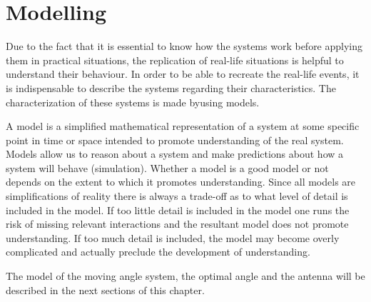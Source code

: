 \chapter{Modelling}\label{ch:model}

Due to the fact that it is essential to know how the systems work before applying them in practical situations, the replication of real-life situations is helpful to understand their behaviour. In order to be able to recreate the real-life events, it is indispensable to describe the systems regarding their characteristics. The characterization of these systems is made byusing models.  

A model is a simplified mathematical representation of a system at some specific point in time or space intended to promote understanding of the real system. Models allow us to reason about a system and make predictions about how a system will behave (simulation). Whether a model is a good model or not depends on the extent to which it promotes understanding. Since all models are simplifications of reality there is always a trade-off as to what level of detail is included in the model. If too little detail is included in the model one runs the risk of missing relevant interactions and the resultant model does not promote understanding. If too much detail is included, the model may become overly complicated and actually preclude the development of understanding. 

The model of the moving angle system, the optimal angle and the antenna will be described in the next sections of this chapter.